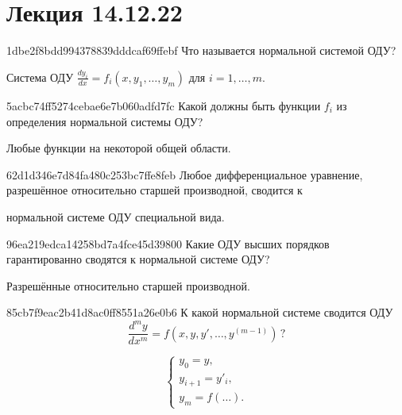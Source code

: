 \section{Лекция 14.12.22}
\begin{note}{1dbe2f8bdd994378839dddcaf69ffebf}
    Что называется нормальной системой ОДУ?

    \begin{cloze}{1}
        Система ОДУ \({ \frac{dy_i}{dx} = f_i(x, y_1, \ldots, y_m) }\) для \({ i = 1, \ldots, m }\).
    \end{cloze}
\end{note}

\begin{note}{5acbc74ff5274cebae6e7b060adfd7fc}
    Какой должны быть функции \({ f_i }\) из определения нормальной системы ОДУ?

    \begin{cloze}{1}
        Любые функции на некоторой общей области.
    \end{cloze}
\end{note}

\begin{note}{62d1d346e7d84fa480c253bc7ffe8feb}
    Любое дифференциальное уравнение, разрешённое относительно старшей производной, сводится к \begin{icloze}{1}нормальной системе ОДУ специальной вида.\end{icloze}
\end{note}

\begin{note}{96ea219edca14258bd7a4fce45d39800}
    Какие ОДУ высших порядков гарантированно сводятся к нормальной системе ОДУ?

    \begin{cloze}{1}
        Разрешённые относительно старшей производной.
    \end{cloze}
\end{note}

\begin{note}{85cb7f9eac2b41d8ac0ff8551a26e0b6}
    К какой нормальной системе сводится ОДУ
    \[
        \frac{d^{m}y}{dx^{m}} = f(x, y, y', \ldots, y^{(m-1)})\,?
    \]

    \begin{cloze}{1}
        \[
            \begin{cases}
                y_0 = y, \\
                y_{i+1} = y'_i, \\
                y_m = f(\ldots).
            \end{cases}
        \]
    \end{cloze}
\end{note}

